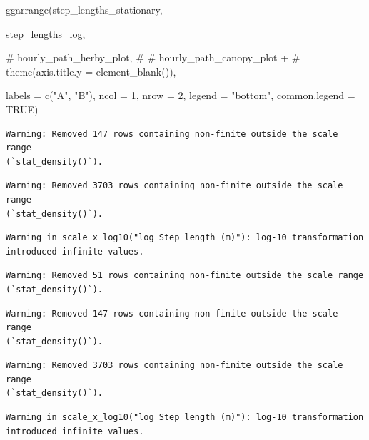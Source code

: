 \documentclass[
  letterpaper,
  DIV=11,
  numbers=noendperiod]{scrartcl}
\newenvironment{Shaded}{\begin{snugshade}}{\end{snugshade}}
\newcommand{\AttributeTok}[1]{\textcolor[rgb]{0.40,0.45,0.13}{#1}}
\newcommand{\CommentTok}[1]{\textcolor[rgb]{0.37,0.37,0.37}{#1}}
\newcommand{\ConstantTok}[1]{\textcolor[rgb]{0.56,0.35,0.01}{#1}}
\newcommand{\DecValTok}[1]{\textcolor[rgb]{0.68,0.00,0.00}{#1}}
\newcommand{\FunctionTok}[1]{\textcolor[rgb]{0.28,0.35,0.67}{#1}}
\newcommand{\NormalTok}[1]{\textcolor[rgb]{0.00,0.23,0.31}{#1}}
\newcommand{\StringTok}[1]{\textcolor[rgb]{0.13,0.47,0.30}{#1}}
\begin{document}
\begin{Shaded}
\begin{Highlighting}[]
\FunctionTok{ggarrange}\NormalTok{(step\_lengths\_stationary,}
          
\NormalTok{          step\_lengths\_log,}

          \CommentTok{\# hourly\_path\_herby\_plot,}
          \CommentTok{\# }
          \CommentTok{\# hourly\_path\_canopy\_plot +}
          \CommentTok{\#   theme(axis.title.y = element\_blank()),}

          \AttributeTok{labels =} \FunctionTok{c}\NormalTok{(}\StringTok{"A"}\NormalTok{, }\StringTok{"B"}\NormalTok{),}
          \AttributeTok{ncol =} \DecValTok{1}\NormalTok{, }\AttributeTok{nrow =} \DecValTok{2}\NormalTok{,}
          \AttributeTok{legend =} \StringTok{"bottom"}\NormalTok{,}
          \AttributeTok{common.legend =} \ConstantTok{TRUE}\NormalTok{)}
\end{Highlighting}
\end{Shaded}

\begin{verbatim}
Warning: Removed 147 rows containing non-finite outside the scale range
(`stat_density()`).
\end{verbatim}

\begin{verbatim}
Warning: Removed 3703 rows containing non-finite outside the scale range
(`stat_density()`).
\end{verbatim}

\begin{verbatim}
Warning in scale_x_log10("log Step length (m)"): log-10 transformation
introduced infinite values.
\end{verbatim}

\begin{verbatim}
Warning: Removed 51 rows containing non-finite outside the scale range
(`stat_density()`).
\end{verbatim}

\begin{verbatim}
Warning: Removed 147 rows containing non-finite outside the scale range
(`stat_density()`).
\end{verbatim}

\begin{verbatim}
Warning: Removed 3703 rows containing non-finite outside the scale range
(`stat_density()`).
\end{verbatim}

\begin{verbatim}
Warning in scale_x_log10("log Step length (m)"): log-10 transformation
introduced infinite values.
\end{verbatim}
\end{document}
